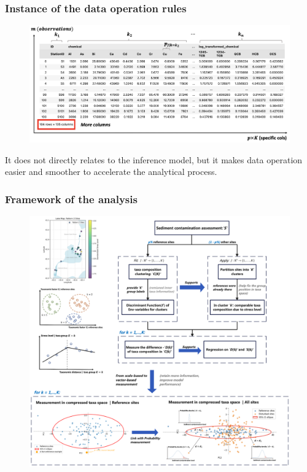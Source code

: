 \documentclass{beamer}
\begin{document}
\begin{frame}
\frametitle{Instance of the data operation rules}

\begin{figure}
\centering
\includegraphics[width=\textwidth]{figures/p5_application_data_rules.png}
\end{figure}

It does not directly relates to the inference model, but it makes data operation easier and smoother
to accelerate the analytical process.
\end{frame}

\begin{frame}
\frametitle{Framework of the analysis}
\begin{figure}
\centering
\includegraphics[height=0.85\textheight,keepaspectratio]{figures/p6_workflow_of_general_workframe.png}        
\end{figure}
\end{frame}
\end{document}
